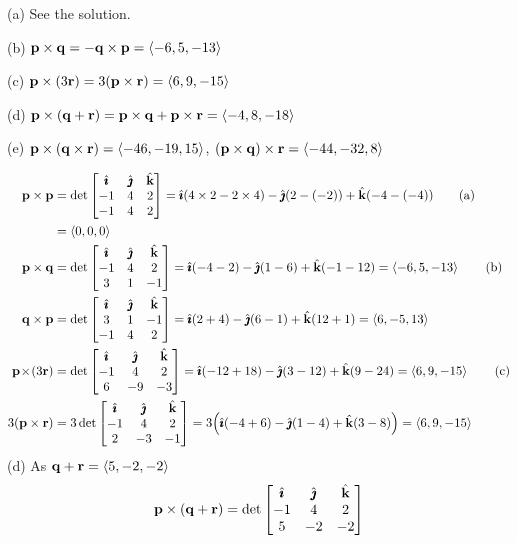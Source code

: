 
\begin{answer}
(a) See the solution.

(b) $\mathbf{p}\times\mathbf{q} = -\mathbf{q}\times\mathbf{p} = \left< -6,5,-13\right>$

(c) $\mathbf{p} \times (3\mathbf{r}) = 3(\mathbf{p}\times\mathbf{r}) =  \left< 6,9,-15\right>$

(d) $\mathbf{p}\times(\mathbf{q}+\mathbf{r}) = \mathbf{p}\times\mathbf{q}+\mathbf{p}\times\mathbf{r} =  \left< -4,8,-18\right>$ 

(e) $\mathbf{p}\times(\mathbf{q}\times\mathbf{r}) = \left< -46,-19,15\right>$,
    $(\mathbf{p}\times\mathbf{q})\times\mathbf{r} = \left< -44,-32,8\right>$

\end{answer}

\begin{solution}
\leqnomode
\begin{align}
\vp\times\vp 
&= \det\left[ \begin{matrix}\hi&\hj&\hk\cr-1&4&2\cr-1&4&2\end{matrix}\right]
=\hi(4\times2-2\times4)-\hj(2-(-2))
+\hk(-4-(-4)) \tag{a} \\
&= \llt 0,0,0\rgt \notag \\
%
\vp\times\vq 
&= \det\left[ \begin{matrix}\hi&\hj&\hk\cr-1&4&2\cr3&1&-1\end{matrix}\right]
=\hi(-4-2)-\hj(1-6)
+\hk(-1-12) 
= \llt -6,5,-13\rgt \tag{b} \\
\vq\times\vp 
&= \det\left[ \begin{matrix}\hi&\hj&\hk\cr3&1&-1\cr-1&4&2\end{matrix}\right]
=\hi(2+4)-\hj(6-1)
+\hk(12+1) 
= \llt 6,-5,13\rgt \notag \\
%
\vp\!\times\!(3\vr) 
&= \det\left[ \begin{matrix}\hi&\hj&\hk\cr-1&4&2\cr6&-9&-3\end{matrix}\right]
=\hi(-12+18)-\hj(3-12)
+\hk(9-24) 
= \llt 6,9,-15\rgt \tag{c} \\
3(\vp\times\vr) 
&= 3\det\left[ \begin{matrix}\hi&\hj&\hk\cr-1&4&2\cr2&-3&-1\end{matrix}\right]
=3\Big(\hi(-4+6)-\hj(1-4)
+\hk(3-8) \Big)
= \llt 6,9,-15\rgt \notag
\end{align}
(d) As $\mathbf{q}+\mathbf{r}=\left< 5,-2,-2\right> $
\begin{align*}
\vp\times(\vq+\vr)
= \det\left[\begin{matrix}\hi&\hj&\hk\cr-1&4&2\cr5&-2&-2\end{matrix}\right]

\end{align*}
\end{solution}
